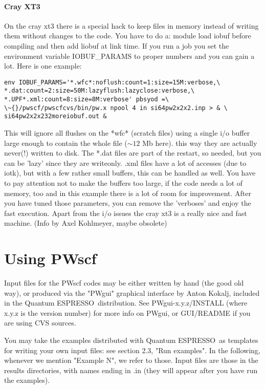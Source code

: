 \documentclass[12pt,a4paper]{article}
\def\qe{{\sc Quantum ESPRESSO}}
\begin{document}
\paragraph{Cray XT3}
On the cray xt3 there is a special hack to keep files in
memory instead of writing them without changes to the code.
You have to do a: 
module load iobuf
before compiling and then add liobuf at link time.
If you run a job you set the environment variable 
IOBUF\_PARAMS to proper numbers and you can gain a lot.
Here is one example:
\begin{verbatim}
env IOBUF_PARAMS='*.wfc*:noflush:count=1:size=15M:verbose,\
*.dat:count=2:size=50M:lazyflush:lazyclose:verbose,\
*.UPF*.xml:count=8:size=8M:verbose' pbsyod =\
\~{}/pwscf/pwscfcvs/bin/pw.x npool 4 in si64pw2x2x2.inp > & \
si64pw2x2x232moreiobuf.out &
\end{verbatim}
This will ignore all flushes on the *wfc* (scratch files) using a
single i/o buffer large enough to contain the whole file ($\sim 12$ Mb here).
this way they are actually never(!) written to disk.
The *.dat files are part of the restart, so needed, but you can be
'lazy' since they are writeonly. .xml files have a lot of accesses
(due to iotk), but with a few rather small buffers, this can be
handled as well. You have to pay attention not to make the buffers
too large, if the code needs a lot of memory, too and in this example
there is a lot of room for improvement. After you have tuned those
parameters, you can remove the 'verboses' and enjoy the fast execution.
Apart from the i/o issues the cray xt3 is a really nice and fast machine.
(Info by Axel Kohlmeyer, maybe obsolete)

\section{Using PWscf}

Input files for the PWscf codes may be either written by hand (the good old
way), or produced via the "PWgui" graphical interface by Anton Kokalj, 
included in the \qe\ distribution. See PWgui-x.y.z/INSTALL
(where x.y.z is the version number) for more info on PWgui, or GUI/README
if you are using CVS sources.
    
You may take the examples distributed with \qe\ as
templates for writing your own input files: see section 2.3, "Run examples".
In the following, whenever we mention "Example N", we refer to those. Input
files are those in the results directories, with names ending in .in 
(they will appear after you have run the examples).
    
\end{document}
